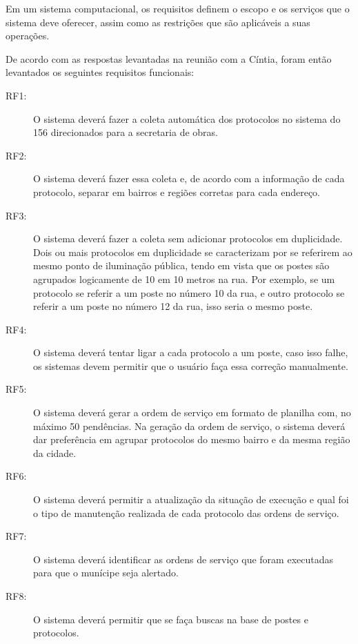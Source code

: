 \documentclass[
	article,			%
	11pt,				%
	oneside,			%
	a4paper,			%
	english,			%
	brazil,				%
	sumario=tradicional
	]{abntex2}
\begin{document}
Em um sistema computacional, os requisitos definem o escopo e os serviços que o
sistema deve oferecer, assim como as restrições que são aplicáveis a suas
operações.

De acordo com as respostas levantadas na reunião com a Cíntia, foram então levantados os seguintes requisitos funcionais:

\begin{description}
\item[RF1:] O sistema deverá fazer a coleta automática dos protocolos no sistema do 156
direcionados para a secretaria de obras.
\item[RF2:] O sistema deverá fazer essa coleta e, de acordo com a informação de cada
protocolo, separar em bairros e regiões corretas para cada endereço.
\item[RF3:] O sistema deverá fazer a coleta sem adicionar protocolos em duplicidade.
Dois ou mais protocolos em duplicidade se caracterizam por se referirem ao
mesmo ponto de iluminação pública, tendo em vista que os postes são agrupados
logicamente de 10 em 10 metros na rua. Por exemplo, se um protocolo se referir
a um poste no número 10 da rua, e outro protocolo se referir a um poste no número
12 da rua, isso seria o mesmo poste.
\item[RF4:] O sistema deverá tentar ligar a cada protocolo a um poste, caso isso falhe,
os sistemas devem permitir que o usuário faça essa correção manualmente.
\item[RF5:] O sistema deverá gerar a ordem de serviço em formato de planilha com,
no máximo 50 pendências. Na geração da ordem de serviço, o sistema deverá
dar preferência em agrupar protocolos do mesmo bairro e da mesma região da cidade.
\item[RF6:] O sistema deverá permitir a atualização da situação de execução e qual foi
o tipo de manutenção realizada de cada protocolo das ordens de serviço.
\item[RF7:] O sistema deverá identificar as ordens de serviço que foram executadas para
que o munícipe seja alertado.
\item[RF8:] O sistema deverá permitir que se faça buscas na base de postes e protocolos.
\end{description}



\end{document}
